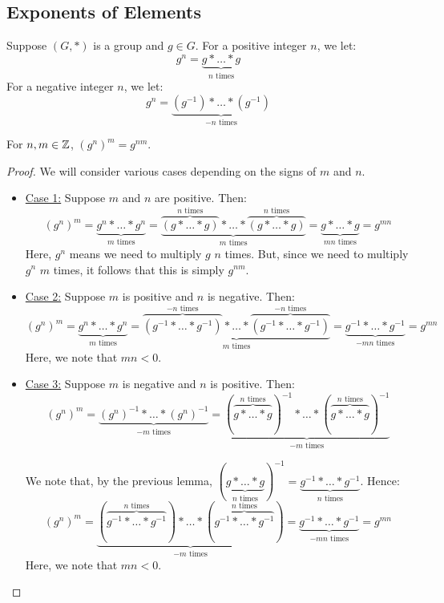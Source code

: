 \documentclass[letterpaper]{article}
\begin{document}
\subsection{Exponents of Elements}
Suppose $(G, *)$ is a group and $g \in G$. For a positive integer $n$, we let: 
\[g^n = \underbrace{g * \dots * g}_{n \text{ times}}\]
For a negative integer $n$, we let: 
\[g^n = \underbrace{(g^{-1}) * \dots * (g^{-1})}_{-n \text{ times}}\]

\begin{lemma}{}{}
    For $n, m \in \mathbb{Z}$, $(g^n)^m = g^{nm}$. 
\end{lemma}

\begin{mdframed}
    \begin{proof}
        We will consider various cases depending on the signs of $m$ and $n$. 
        \begin{itemize}
            \item \underline{Case 1:} Suppose $m$ and $n$ are positive. Then: 
            \[(g^n)^m = \underbrace{g^n * \dots * g^n}_{m \text{ times}} = \underbrace{\overbrace{(g * \dots * g)}^{n \text{ times}} * \dots * \overbrace{(g * \dots * g)}^{n \text{ times}}}_{m \text{ times}} = \underbrace{g * \dots * g}_{mn \text{ times}} = g^{mn}\]
            Here, $g^n$ means we need to multiply $g$ $n$ times. But, since we need to multiply $g^n$ $m$ times, it follows that this is simply $g^{nm}$.  

            \item \underline{Case 2:} Suppose $m$ is positive and $n$ is negative. Then: 
            \[(g^n)^m = \underbrace{g^n * \dots * g^n}_{m \text{ times}} = \underbrace{\overbrace{(g^{-1} * \dots * g^{-1})}^{-n \text{ times}} * \dots * \overbrace{(g^{-1} * \dots * g^{-1})}^{-n \text{ times}}}_{m \text{ times}} = \underbrace{g^{-1} * \dots * g^{-1}}_{-mn \text{ times}} = g^{mn}\]
            Here, we note that $mn < 0$. 

            \item \underline{Case 3:} Suppose $m$ is negative and $n$ is positive. Then: 
            \[(g^n)^m = \underbrace{(g^n)^{-1} * \dots * (g^n)^{-1}}_{-m \text{ times}} = \underbrace{(\overbrace{g * \dots * g}^{n \text{ times}})^{-1} * \dots * (\overbrace{g * \dots * g}^{n \text{ times}})^{-1}}_{-m \text{ times}}\]

            We note that, by the previous lemma, $(\underbrace{g * \dots * g}_{n \text{ times}})^{-1} = \underbrace{g^{-1} * \dots * g^{-1}}_{n \text{ times}}$. Hence: 
            \[(g^n)^m = \underbrace{(\overbrace{g^{-1} * \dots * g^{-1}}^{n \text{ times}}) * \dots * (\overbrace{g^{-1} * \dots * g^{-1}}^{n \text{ times}})}_{-m \text{ times}} = \underbrace{g^{-1} * \dots * g^{-1}}_{-mn \text{ times}} = g^{mn}\]
            Here, we note that $mn < 0$.  


\end{itemize}
\end{proof}
\end{mdframed}
\end{document}
